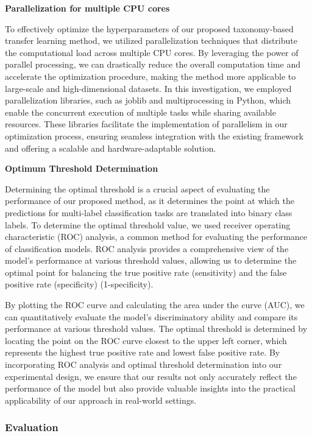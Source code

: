 \textbf{Parallelization for multiple CPU cores}

To effectively optimize the hyperparameters of our proposed taxonomy-based transfer learning method, we utilized parallelization techniques that distribute the computational load across multiple CPU cores. By leveraging the power of parallel processing, we can drastically reduce the overall computation time and accelerate the optimization procedure, making the method more applicable to large-scale and high-dimensional datasets. In this investigation, we employed parallelization libraries, such as joblib and multiprocessing in Python, which enable the concurrent execution of multiple tasks while sharing available resources. These libraries facilitate the implementation of parallelism in our optimization process, ensuring seamless integration with the existing framework and offering a scalable and hardware-adaptable solution.


\textbf{Optimum Threshold Determination}

Determining the optimal threshold is a crucial aspect of evaluating the performance of our proposed method, as it determines the point at which the predictions for multi-label classification tasks are translated into binary class labels. To determine the optimal threshold value, we used receiver operating characteristic (ROC) analysis, a common method for evaluating the performance of classification models. ROC analysis provides a comprehensive view of the model's performance at various threshold values, allowing us to determine the optimal point for balancing the true positive rate (sensitivity) and the false positive rate (specificity) (1-specificity).

By plotting the ROC curve and calculating the area under the curve (AUC), we can quantitatively evaluate the model's discriminatory ability and compare its performance at various threshold values. The optimal threshold is determined by locating the point on the ROC curve closest to the upper left corner, which represents the highest true positive rate and lowest false positive rate. By incorporating ROC analysis and optimal threshold determination into our experimental design, we ensure that our results not only accurately reflect the performance of the model but also provide valuable insights into the practical applicability of our approach in real-world settings.


\subsubsection{Evaluation}

